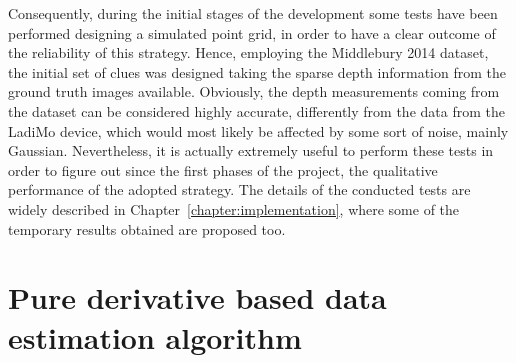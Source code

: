 Consequently, during the initial stages of the development some tests have been performed designing a simulated point grid, in order to have a clear outcome of the reliability of this strategy.
Hence, employing the Middlebury 2014 dataset, the initial set of clues was designed taking the sparse depth information from the ground truth images available. 
Obviously, the depth measurements coming from the dataset can be considered highly accurate, differently from the data from the LadiMo device, which would most likely be affected by some sort of noise, mainly Gaussian. 
Nevertheless, it is actually extremely useful to perform these tests in order to figure out since the first phases of the project, the qualitative performance of the adopted strategy.
The details of the conducted tests are widely described in Chapter~\ref{chapter:implementation}, where some of the temporary results obtained are proposed too.\\


\section{Pure derivative based data estimation algorithm}
\label{section:deriv-based-algorithm}

